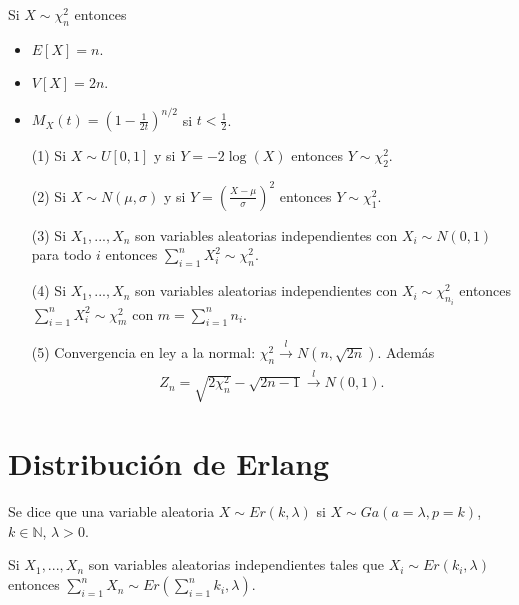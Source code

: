 \begin{obs}
Si $X \sim \chi_n^2$ entonces
\begin{itemize}
    \item $E[X] = n$.
    \item $V[X] = 2n$.
    \item $M_X(t) = \left( 1 - \frac{1}{2t} \right)^{n/2}$ si $t < \frac{1}{2}$.
\end{itemize}
\end{obs}

\begin{prop}
\begin{enumerate}
    \item[(1)] Si $X \sim U[0,1]$ y si $Y = -2\log(X)$ entonces $Y \sim \chi_2^2$.
    \item[(2)] Si $X \sim N(\mu, \sigma)$ y si $Y = \left( \frac{X - \mu}{\sigma}\right)^2$ entonces $Y \sim \chi_1^2$.
    \item[(3)] Si $X_1,...,X_n$ son variables aleatorias independientes con $X_i \sim N(0,1)$ para todo $i$ entonces $\sum_{i=1}^{n}{X_i^2} \sim \chi_n^2$.
    \item[(4)] Si $X_1,...,X_n$ son variables aleatorias independientes con $X_i \sim \chi_{n_i}^2$ entonces $\sum_{i=1}^{n}{X_i^2} \sim \chi_m^2$ con $m = \sum_{i=1}^{n}{n_i}$.
    \item[(5)] Convergencia en ley a la normal: $\chi_n^2 \xrightarrow[]{ \ \ l \ \ } N(n, \sqrt{2n})$. Además
    \begin{align*}
        Z_n= \sqrt{2\chi_n^2} - \sqrt{2n -1} \xrightarrow[]{ \ \ l \ \ } N(0,1).
    \end{align*}
\end{enumerate}
\end{prop}

\section{Distribución de Erlang}

\begin{defi}
Se dice que una variable aleatoria $X \sim Er(k, \lambda)$ si $X \sim Ga(a = \lambda, p = k)$, $k \in \mathbb{N}$, $\lambda > 0$.
\end{defi}

\begin{obs}
Si $X_1, ..., X_n$ son variables aleatorias independientes tales que $X_i \sim Er(k_i, \lambda)$ entonces
$\sum_{i=1}^{n}{X_n} \sim Er\left( \sum_{i=1}^{n}{k_i}, \lambda\right)$.
\end{obs}

